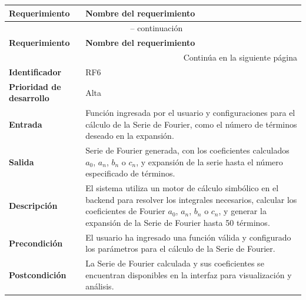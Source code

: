 \begin{longtable}{|m{3.5cm}|m{9.5cm}|}
	\hline
	\rowcolor{black!75} \color{white}\textbf{Requerimiento} & \color{white}\textbf{Nombre del requerimiento} \\
	\hline
	\endfirsthead
	\multicolumn{2}{c}{{\tablename\ \thetable{} -- continuación}} \\
	\hline
	\rowcolor{black!75} \color{white}\textbf{Requerimiento} & \color{white}\textbf{Nombre del requerimiento} \\
	\hline
	\endhead
	\hline \multicolumn{2}{r}{{Continúa en la siguiente página}} \\
	\endfoot
	\hline
	\endlastfoot
	
	\textbf{Identificador} & RF6 \\
	\hline
	\textbf{Prioridad de desarrollo} & Alta \\
	\hline
	\textbf{Entrada} & Función ingresada por el usuario y configuraciones para el cálculo de la Serie de Fourier, como el número de términos deseado en la expansión. \\
	\hline
	\textbf{Salida} & Serie de Fourier generada, con los coeficientes calculados \( a_0 \), \( a_n \), \( b_n \) o \( c_n \), y expansión de la serie hasta el número especificado de términos. \\
	\hline
	\textbf{Descripción} & El sistema utiliza un motor de cálculo simbólico en el backend para resolver los integrales necesarios, calcular los coeficientes de Fourier \( a_0 \), \( a_n \), \( b_n \) o \( c_n \), y generar la expansión de la Serie de Fourier hasta 50 términos. \\
	\hline
	\textbf{Precondición} & El usuario ha ingresado una función válida y configurado los parámetros para el cálculo de la Serie de Fourier. \\
	\hline
	\textbf{Postcondición} & La Serie de Fourier calculada y sus coeficientes se encuentran disponibles en la interfaz para visualización y análisis. \\
	\hline
\end{longtable}
\caption{Requerimiento funcional No. 6} \label{tabla:RF6}
\vspace{0.5cm}

